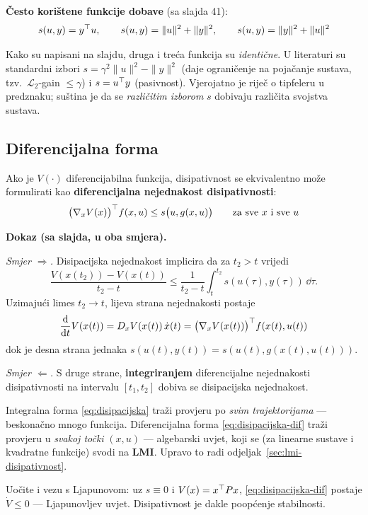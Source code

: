 \textbf{Često korištene funkcije dobave} (sa slajda 41):
\[
s(u,y) = y^{\top} u, \qquad
s(u,y) = \|u\|^2 + \|y\|^2, \qquad
s(u,y) = \|y\|^2 + \|u\|^2
\]

\begin{napomena}
Kako su napisani na slajdu, druga i treća funkcija su \emph{identične}. U
literaturi su standardni izbori $s = \gamma^2\|u\|^2 - \|y\|^2$ (daje ograničenje
na pojačanje sustava, tzv.\ $\mathcal{L}_2$-gain $\le \gamma$) i
$s = u^{\top} y$ (pasivnost). Vjerojatno je riječ o tipfeleru u predznaku; suština je
da se \emph{različitim izborom} $s$ dobivaju različita svojstva sustava.
\end{napomena}

\subsection{Diferencijalna forma}

\begin{teorem}
Ako je $V(\cdot)$ diferencijabilna funkcija, disipativnost se ekvivalentno može
formulirati kao \textbf{diferencijalna nejednakost disipativnosti}:
\begin{equation}
\label{eq:disipacijska-dif}
\big(\nabla_xV(x)\big)^{\top} f(x,u) \le s\big(u, g(x,u)\big)
\qquad\text{za sve } x \text{ i sve } u
\end{equation}
\end{teorem}

\textbf{Dokaz (sa slajda, u oba smjera).}

\emph{Smjer $\Rightarrow$.} Disipacijska nejednakost implicira da za $t_2 > t$
vrijedi
\[
\frac{V(x(t_2)) - V(x(t))}{t_2 - t}
\le \frac{1}{t_2-t}\int_t^{t_2} s(u(\tau), y(\tau))\,\dd\tau.
\]
Uzimajući limes $t_2 \to t$, lijeva strana nejednakosti postaje
\[
\frac{\mathrm{d}}{\mathrm{d} t}V(x(t)) = D_xV(x(t))\,\dot x(t)
= \big(\nabla_xV(x(t))\big)^{\top} f(x(t), u(t))
\]
dok je desna strana jednaka
$s(u(t), y(t)) = s(u(t), g(x(t), u(t)))$.

\emph{Smjer $\Leftarrow$.} S druge strane, \textbf{integriranjem} diferencijalne
nejednakosti disipativnosti na intervalu $[t_1,t_2]$ dobiva se disipacijska
nejednakost.

\begin{napomena}
Integralna forma \eqref{eq:disipacijska} traži provjeru po \emph{svim
trajektorijama} --- beskonačno mnogo funkcija. Diferencijalna forma
\eqref{eq:disipacijska-dif} traži provjeru u \emph{svakoj točki} $(x,u)$ ---
algebarski uvjet, koji se (za linearne sustave i kvadratne funkcije) svodi na
\textbf{LMI}. Upravo to radi odjeljak~\ref{sec:lmi-disipativnost}.

Uočite i vezu s Ljapunovom: uz $s \equiv 0$ i $V(x) = x^{\top} Px$,
\eqref{eq:disipacijska-dif} postaje $\dot V \le 0$ --- Ljapunovljev uvjet.
Disipativnost je dakle poopćenje stabilnosti.
\end{napomena}

